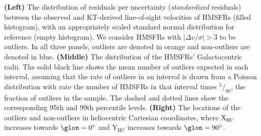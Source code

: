 \label{fig:outliers}
\textbf{(Left)} The distribution of residuals per uncertainty (\textit{standardized} residuals) between the observed and KT-derived line-of-sight velocities of HMSFRs (filled histogram), with an appropriately scaled standard normal distribution for reference (empty histogram). We consider HMSFRs with $\vert \Delta v / \sigma \vert > 3$ to be outliers. In all three panels, outliers are denoted in orange and non-outliers are denoted in blue. \textbf{(Middle)} The distribution of the HMSFRs' Galactocentric radii. 
The solid black line shows the mean number of outliers expected in each interval, assuming that the rate of outliers in an interval is drawn from a Poisson distribution with rate the number of HMSFRs in that interval times $^{5}/_{99}$, the fraction of outliers in the sample. The dashed and dotted lines show the corresponding 95th and 99th percentile levels.
\textbf{(Right)} The locations of the outliers and non-outliers in heliocentric Cartesian coordinates, where $\mathrm{X_{HC}}$ increases towards $\glon=0^\circ$ and $\mathrm{Y_{HC}}$ increases towards $\glon=90^\circ$.